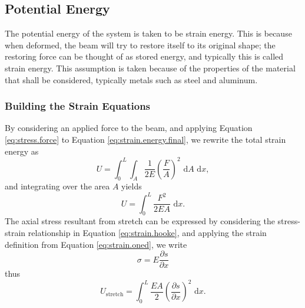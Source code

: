 \subsection{Potential Energy}

The potential energy of the system is taken to be strain energy. This is because when deformed, the beam will try to restore itself to its original shape; the restoring force can be thought of as stored energy, and typically this is called strain energy. This assumption is taken because of the properties of the material that shall be considered, typically metals such as steel and aluminum.

\subsubsection{Building the Strain Equations}
By considering an applied force to the beam, and applying Equation \ref{eq:stress.force} to Equation \ref{eq:strain.energy.final}, we rewrite the total strain energy as
\begin{equation}
U = \int_0^L\int_A\frac{1}{2E}\left(\frac{F}{A}\right)^2\text{ d}A\text{ d}x,
\end{equation}
and integrating over the area $A$ yields
\begin{equation}
U = \int_0^L\frac{F^2}{2EA}\text{ d}x.
\end{equation}
The axial stress resultant from stretch can be expressed by considering the stress-strain relationship in Equation \ref{eq:strain.hooke}, and applying the strain definition from Equation \ref{eq:strain.oned}, we write
\begin{equation}
\sigma = E\frac{\partial s}{\partial x}
\end{equation} 
thus
\begin{equation}
U_{\text{stretch}} = \int_0^L\frac{EA}{2}\left(\frac{\partial s}{\partial x}\right)^2\text{ d}x.
\end{equation}

